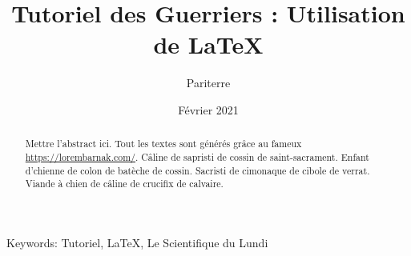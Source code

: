 \documentclass[]{article}
\title{Tutoriel des Guerriers : Utilisation de \LaTeX}
\author{Pariterre}
\date{Février 2021}
\begin{document}
\maketitle
\begin{abstract}
  Mettre l'abstract ici. 
  Tout les textes sont générés grâce au fameux \url{https://lorembarnak.com/}.
  Câline de sapristi de cossin de saint-sacrament.
  Enfant d'chienne de colon de batèche de cossin.
  Sacristi de cimonaque de cibole de verrat.
  Viande à chien de câline de crucifix de calvaire.
\end{abstract}
Keywords: Tutoriel, \LaTeX, Le Scientifique du Lundi

\tableofcontents


\newpage




 



\end{document}
